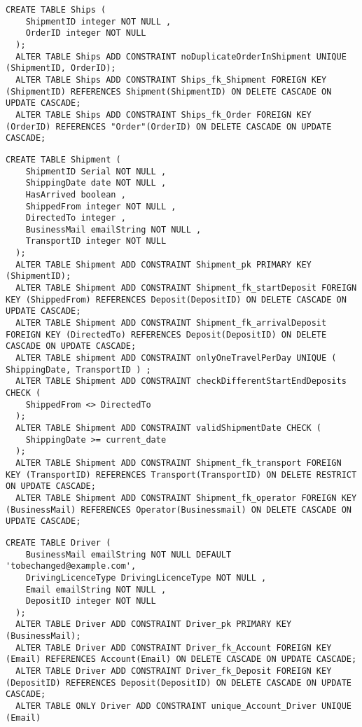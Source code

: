 \begin{lstlisting}[caption={Creazione della tabella \textbf{Ships}}]
  CREATE TABLE Ships ( 
    ShipmentID integer NOT NULL ,
    OrderID integer NOT NULL
  );
  ALTER TABLE Ships ADD CONSTRAINT noDuplicateOrderInShipment UNIQUE (ShipmentID, OrderID);
  ALTER TABLE Ships ADD CONSTRAINT Ships_fk_Shipment FOREIGN KEY (ShipmentID) REFERENCES Shipment(ShipmentID) ON DELETE CASCADE ON UPDATE CASCADE;
  ALTER TABLE Ships ADD CONSTRAINT Ships_fk_Order FOREIGN KEY (OrderID) REFERENCES "Order"(OrderID) ON DELETE CASCADE ON UPDATE CASCADE;
\end{lstlisting}

\newpage
\begin{lstlisting}[caption={Creazione della tabella \textbf{Shipment}}]
  CREATE TABLE Shipment (
    ShipmentID Serial NOT NULL ,
    ShippingDate date NOT NULL ,
    HasArrived boolean ,
    ShippedFrom integer NOT NULL ,
    DirectedTo integer ,
    BusinessMail emailString NOT NULL ,
    TransportID integer NOT NULL
  );
  ALTER TABLE Shipment ADD CONSTRAINT Shipment_pk PRIMARY KEY (ShipmentID);
  ALTER TABLE Shipment ADD CONSTRAINT Shipment_fk_startDeposit FOREIGN KEY (ShippedFrom) REFERENCES Deposit(DepositID) ON DELETE CASCADE ON UPDATE CASCADE;
  ALTER TABLE Shipment ADD CONSTRAINT Shipment_fk_arrivalDeposit FOREIGN KEY (DirectedTo) REFERENCES Deposit(DepositID) ON DELETE CASCADE ON UPDATE CASCADE;
  ALTER TABLE shipment ADD CONSTRAINT onlyOneTravelPerDay UNIQUE ( ShippingDate, TransportID ) ;
  ALTER TABLE Shipment ADD CONSTRAINT checkDifferentStartEndDeposits CHECK (
    ShippedFrom <> DirectedTo
  );
  ALTER TABLE Shipment ADD CONSTRAINT validShipmentDate CHECK (
    ShippingDate >= current_date
  );
  ALTER TABLE Shipment ADD CONSTRAINT Shipment_fk_transport FOREIGN KEY (TransportID) REFERENCES Transport(TransportID) ON DELETE RESTRICT ON UPDATE CASCADE;
  ALTER TABLE Shipment ADD CONSTRAINT Shipment_fk_operator FOREIGN KEY (BusinessMail) REFERENCES Operator(Businessmail) ON DELETE CASCADE ON UPDATE CASCADE;
\end{lstlisting} 
 
\begin{lstlisting}[caption={Creazione della tabella \textbf{Driver}}]
  CREATE TABLE Driver (
    BusinessMail emailString NOT NULL DEFAULT 'tobechanged@example.com',
    DrivingLicenceType DrivingLicenceType NOT NULL ,
    Email emailString NOT NULL , 
    DepositID integer NOT NULL 
  );
  ALTER TABLE Driver ADD CONSTRAINT Driver_pk PRIMARY KEY (BusinessMail);
  ALTER TABLE Driver ADD CONSTRAINT Driver_fk_Account FOREIGN KEY (Email) REFERENCES Account(Email) ON DELETE CASCADE ON UPDATE CASCADE;
  ALTER TABLE Driver ADD CONSTRAINT Driver_fk_Deposit FOREIGN KEY (DepositID) REFERENCES Deposit(DepositID) ON DELETE CASCADE ON UPDATE CASCADE;
  ALTER TABLE ONLY Driver ADD CONSTRAINT unique_Account_Driver UNIQUE (Email)
\end{lstlisting}

